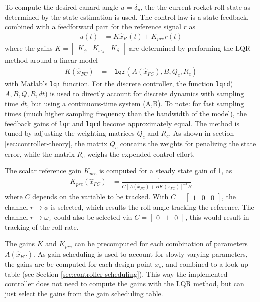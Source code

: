 To compute the desired canard angle $u = \delta_u$, the the current rocket roll state as determined by the state estimation is used.
The control law is a state feedback, combined with a feedforward part for the reference signal $r$ as
\begin{align}
    u(t) &= K \hat x_R(t) + K_{pre} r(t)
\end{align}
where the gains $K = \begin{bmatrix} K_\phi & K_{\omega_X} & K_\delta \end{bmatrix}$ are determined by performing the LQR method around a linear model
\begin{align}
    K(\hat x_{FC}) &= -\texttt{lqr}(A(\hat x_{FC}),B,Q_{c},R_{c}) 
\end{align}
with Matlab's \texttt{lqr} function. 
For the discrete controller, the function \texttt{lqrd}($A, B, Q, R, dt$) is used to directly account for discrete dynamics with sampling time $dt$, but using a continuous-time system (A,B). 
To note: for fast sampling times (much higher sampling frequency than the bandwidth of the model), the feedback gains of \texttt{lqr} and \texttt{lqrd} become approximately equal.
The method is tuned by adjusting the weighting matrices $Q_c$ and $R_c$.
As shown in section \ref{sec:controller-theory}, the matrix $Q_c$ contains the weights for penalizing the state error, while the matrix $R_c$ weighs the expended control effort.

The scalar reference gain $K_{pre}$ is computed for a steady state gain of 1, as
\begin{align}
    K_{pre} (\hat x_{FC}) &=  \frac{-1}{C \left[ A(\hat x_{FC}) + B K(\hat x_{FC}) \right]^{-1} B}
\end{align}
where $C$ depends on the variable to be tracked. 
With $C = \begin{bmatrix} 1 & 0 & 0 \end{bmatrix}$, the channel $r \to \phi$ is selected, which results the roll angle tracking the reference.
The channel $r \to \omega_x$ could also be selected via $C = \begin{bmatrix} 0 & 1 & 0 \end{bmatrix}$, this would result in tracking of the roll rate.

The gains $K$ and $K_{pre}$ can be precomputed for each combination of parameters $A(\hat x_{FC})$.
As gain scheduling is used to account for slowly-varying parameters, the gains are be computed for each design point $x_s$, and combined to a look-up table (see Section \ref{sec:controller-scheduling}).
This way the implemented controller does not need to compute the gains with the LQR method, but can just select the gains from the gain scheduling table. 

